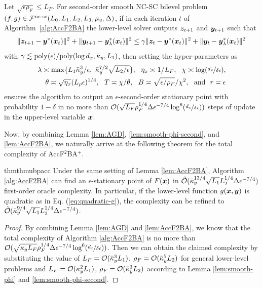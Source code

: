 \documentclass{article}
\begin{document}
\begin{lem}{\citep[Theorem 5.2]{chen2023near}} \label{lem:AccF2BA}
Let $\sqrt{\epsilon \rho_F} \le L_F$.
For second-order smooth NC-SC bilevel problem $(f,g) \in {\mathcal{F}}^{\text{nc-sc}}(L_0,L_1,L_2,L_3,\mu_y,\Delta)$, 
if in each iteration $t$ of Algorithm~\ref{alg:AccF2BA} the lower-level solver outputs 
${\bm{z}}_{t+1}$ and ${\bm{y}}_{t+1}$ such that 
\begin{align*}
    \Vert {\bm{z}}_{t+1} - {\bm{y}}^*({\bm{x}}_t) \Vert^2+ \Vert {\bm{y}}_{t+1} - {\bm{y}}_{\lambda}^*({\bm{x}}_t) \Vert^2 \le \gamma \Vert {\bm{z}}_t - {\bm{y}}^*({\bm{x}}_t) \Vert^2+ \Vert {\bm{y}}_t - {\bm{y}}_{\lambda}^*({\bm{x}}_t) \Vert^2
\end{align*}
with $\gamma \lesssim {\rm poly}(\epsilon) / {\rm poly}(\log d_x, \bar \kappa_y, L_1) $, then setting the hyper-parameters as
\begin{align*}
    \lambda \asymp \max\{ L_1 \bar \kappa_y^3 /\epsilon, ~\bar \kappa_y^{7/2} \sqrt{L_2/\epsilon} \}, ~~ \eta_x \asymp 1/L_F, ~~ \chi \asymp \log(\nicefrac{d_x}{\delta \epsilon}),  \\
    \theta \asymp \sqrt{\eta_x} (L_\rho \epsilon)^{1/4}, ~~ T \asymp \chi / \theta,  ~~ B \asymp \sqrt{\epsilon/\rho_F} / \chi^2, ~~ {\text{and}} ~~ r\asymp \epsilon 
\end{align*}
ensures the algorithm to output an $\epsilon$-second-order stationary point with probability $1-\delta$
in no more than  ${\mathcal{O}}( \sqrt{L_{F}} \rho_{F}^{1/4} \Delta \epsilon^{-7/4} \log^6(\nicefrac{d_x}{\delta \epsilon}))$ steps of update in the upper-level variable ${\bm{x}}$.
\end{lem}

Now, by combining Lemma \ref{lem:AGD}, \ref{lem:smooth-phi-second}, and \ref{lem:AccF2BA}, we naturally arrive at the following theorem for the total complexity of AccF${}^2$BA${}^+$. 

\begin{restatable}{thm}{thmubpacc}  \label{thm:ub-p2}
Under the same setting of Lemma \ref{lem:AccF2BA}, Algorithm \ref{alg:AccF2BA} can find an
$\epsilon$-stationary point of $F({\bm{x}})$ in 
$\tilde {{\mathcal{O}}} ( \bar \kappa_y^{13/4} \sqrt{L_1} L_2^{1/4} \Delta \epsilon^{-7/4}  )$
first-order oracle complexity. In particular, if the lower-level function $g({\bm{x}},{\bm{y}})$ is quadratic as in Eq.  (\ref{eq:quadratic-g}), the complexity can be refined to $\tilde {{\mathcal{O}}} ( \bar \kappa_y^{9/4} \sqrt{L_1} L_2^{1/4} \Delta \epsilon^{-7/4} )$.
\end{restatable}

\begin{proof}
By combining Lemma \ref{lem:AGD} and \ref{lem:AccF2BA}, we know that the total complexity of Algorithm \ref{alg:AccF2BA} is no more than ${\mathcal{O}}( \sqrt{\kappa_y L_F} \rho_F^{1/4} \Delta \epsilon^{-7/4} \log^6 (\nicefrac{d_x}{\delta \epsilon})  )$. Then we can obtain the claimed complexity by substituting the value of $L_F = {\mathcal{O}}(\bar \kappa_y^3 L_1)$, $\rho_F = {\mathcal{O}}(\bar \kappa_y^5 L_2)$ for general lower-level problems and $L_F = {\mathcal{O}}( \kappa_y^2 L_1 )$, $\rho_F = {\mathcal{O}}(\bar \kappa_y^3 L_2)$ according to Lemma \ref{lem:smooth-phi} and \ref{lem:smooth-phi-second}.
\end{proof}
\end{document}
